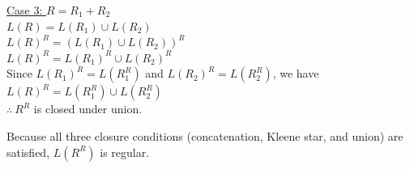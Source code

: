 \documentclass[10pt,letterpaper,unboxed,cm]{article}
\begin{document}
\begin{enumerate}
\medskip

\underline{Case 3: $R = R_1 + R_2$} \\
$L(R) = L(R_1) \cup L(R_2)$ \\
$L(R)^R = (L(R_1) \cup L(R_2))^R$ \\
$L(R)^R = L(R_1)^R \cup L(R_2)^R$ \\
Since $L(R_1)^R = L(R_1^R)$ and $L(R_2)^R = L(R_2^R)$, we have \\
$L(R)^R = L(R_1^R) \cup L(R_2^R)$ \\
$\therefore~ R^R$ is closed under union.

\medskip

Because all three closure conditions (concatenation, Kleene star, and union) are satisfied, $L(R^R)$ is regular.

\end{enumerate}
\end{document}

